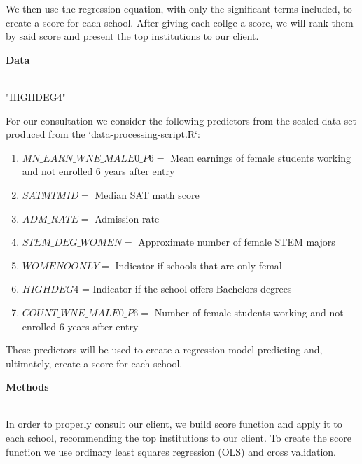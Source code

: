 \documentclass[11pt,english]{article}
\begin{document}
We then use the regression equation, with only the significant terms included, to create a score for each school. After giving each collge a score, we will rank them by said score and present the top institutions to our client.
\vspace*{3\baselineskip}

{\large\textbf{Data}} \\\

 "HIGHDEG4"
              
For our consultation we consider the following predictors from the scaled data set produced from the `data-processing-script.R`:
\begin{enumerate}
\item $ MN\_EARN\_WNE\_MALE0\_P6 =$ Mean earnings of female students working and not enrolled 6 years after entry
\item $ SATMTMID =$ Median SAT math score
\item $ ADM\_RATE =$ Admission rate
\item $ STEM\_DEG\_WOMEN =$ Approximate number of female STEM majors
\item $ WOMENOONLY =$ Indicator if schools that are only femal
\item $ HIGHDEG4 $ = Indicator if the school offers Bachelors degrees 
\item $ COUNT\_WNE\_MALE0\_P6 =$ Number of female students working and not enrolled 6 years after entry
\end{enumerate}

These predictors will be used to create a regression model predicting and, ultimately, create a score for each school.
\vspace*{3\baselineskip}

{\large\textbf{Methods}} \\\

In order to properly consult our client, we build score function and apply it to each school, recommending the top institutions to our client. To create the score function we use ordinary least squares regression (OLS) and cross validation. \\\
\end{document}
